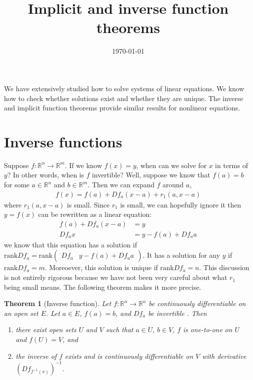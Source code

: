 \documentclass[12pt,reqno]{amsart}
\title{Implicit and inverse function theorems}
\date{\today}
\newtheorem{theorem}{Theorem}[section]
\theoremstyle{definition}
\def\R{\mathbb{R}}
\newcommand{\rank}{\mathrm{rank}}
\renewcommand{\to}{{\rightarrow}}
\begin{document}
\maketitle


We have extensively studied how to solve systems of linear
equations. We know how to check whether solutions exist and whether
they are unique. The inverse and implicit function theorems provide
similar results for nonlinear equations. 

\section{Inverse functions}

Suppose $f: \R^n \to \R^m$. If we know $f(x) = y$, when can we solve
for $x$ in terms of $y$? In other words, when is $f$ invertible? Well,
suppose we know that $f(a) = b$ for some $a \in \R^n$ and $b \in
\R^m$. Then we can expand $f$ around $a$,
\begin{align*}
  f(x) = f(a) + Df_a (x-a) + r_1(a,x-a)
\end{align*}
where $r_1(a,x-a)$ is small. Since $r_1$ is small, we can hopefully
ignore it then $y = f(x)$ can be rewritten as a linear equation:
\begin{align*}
  f(a) + Df_a (x-a) & = y\\
  Df_a x&  = y - f(a) + Df_a a
\end{align*}
we know that this equation has a solution if $\rank Df_a =
\rank \begin{pmatrix} Df_a &  y - f(a) + Df_a a \end{pmatrix}$. It has
a solution for any $y$ if $\rank Df_a = m$. Moreoever, this solution
is unique if $\rank Df_a = n$. This discussion is not entirely
rigorous because we have not been very careful about what $r_1$ being
small means. The following theorem makes it more precise.
\begin{theorem}[Inverse function]
  Let $f: \R^n \to \R^n$ be continuously differentiable on an open set
  $E$. Let $a \in E$, $f(a) = b$, and $Df_a$ be invertible . Then 
  \begin{enumerate}
  \item there exist open sets $U$ and $V$ such that $a \in U$,
    $b \in
    V$, $f$ is one-to-one on $U$ and $f(U) = V$, and
  \item the inverse of $f$ exists and is continuously differentiable
    on $V$ with derivative $\left(Df_{f^{-1}(x)}\right)^{-1}$.
  \end{enumerate}
\end{theorem}
\end{document}
